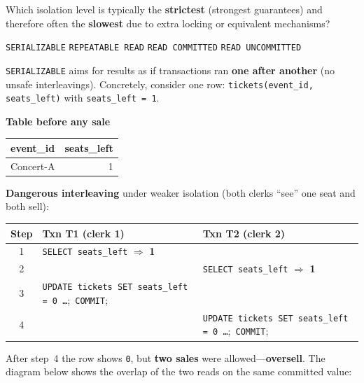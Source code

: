 \newpage 


\question[4]
Which isolation level is typically the \textbf{strictest} (strongest guarantees) and therefore often the \textbf{slowest} due to extra locking or equivalent mechanisms?
\begin{choices}
  \CorrectChoice \texttt{SERIALIZABLE}
  \choice \texttt{REPEATABLE READ}
  \choice \texttt{READ COMMITTED}
  \choice \texttt{READ UNCOMMITTED}
\end{choices}
\begin{solution}
  \texttt{SERIALIZABLE} aims for results as if transactions ran \textbf{one after another} (no unsafe interleavings). Concretely, consider one row: \texttt{tickets(event\_id, seats\_left)} with \texttt{seats\_left = 1}.

  \medskip
  \noindent\textbf{Table before any sale}

  \begin{center}
  \footnotesize
  \begin{tabular}{|l|r|}
    \hline
    \textbf{event\_id} & \textbf{seats\_left} \\
    \hline
    Concert-A & 1 \\
    \hline
  \end{tabular}
  \end{center}

  \noindent\textbf{Dangerous interleaving} under weaker isolation (both clerks ``see'' one seat and both sell):

  \begin{center}
  \footnotesize
  \renewcommand{\arraystretch}{1.15}
  \begin{tabular}{|c|p{}|p{}|}
    \hline
    \textbf{Step} & \textbf{Txn T1 (clerk 1)} & \textbf{Txn T2 (clerk 2)} \\
    \hline
    1 & \texttt{SELECT seats\_left} $\Rightarrow$ \textbf{1} & \\
    2 & & \texttt{SELECT seats\_left} $\Rightarrow$ \textbf{1} \\
    3 & \texttt{UPDATE tickets SET seats\_left = 0 \ldots};\ \texttt{COMMIT}; & \\
    4 & & \texttt{UPDATE tickets SET seats\_left = 0 \ldots};\ \texttt{COMMIT}; \\
    \hline
  \end{tabular}
  \renewcommand{\arraystretch}{1}
  \end{center}

  \noindent After step~4 the row shows \texttt{0}, but \textbf{two sales} were allowed---\textbf{oversell}. The diagram below shows the overlap of the two reads on the same committed value:


\end{solution}
